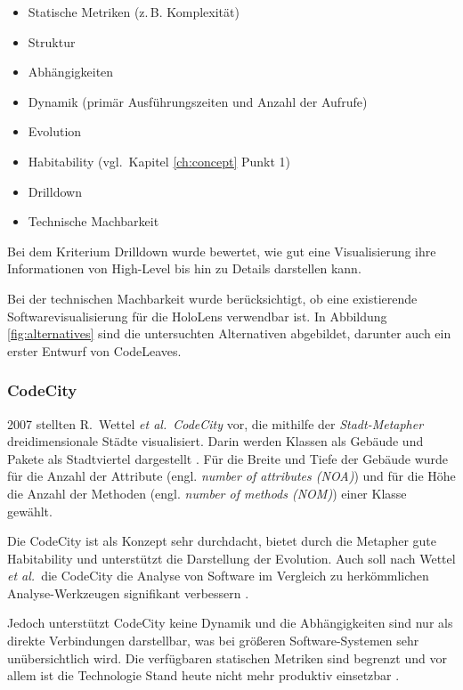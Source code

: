 \begin{itemize}
  \item Statische Metriken (z.\,B. Komplexität)
  \item Struktur
  \item Abhängigkeiten
  \item Dynamik (primär Ausführungszeiten und Anzahl der Aufrufe)
  \item Evolution
  \item Habitability (vgl.\ Kapitel \ref{ch:concept} Punkt 1)
  \item Drilldown
  \item Technische Machbarkeit
\end{itemize}

Bei dem Kriterium Drilldown wurde bewertet, wie gut eine Visualisierung ihre Informationen von High-Level bis hin zu Details darstellen kann.

Bei der technischen Machbarkeit wurde berücksichtigt, ob eine existierende Softwarevisualisierung für die HoloLens verwendbar ist. In Abbildung \ref{fig:alternatives} sind die untersuchten Alternativen abgebildet, darunter auch ein erster Entwurf von CodeLeaves.

\subsubsection*{CodeCity}
2007 stellten R.\ Wettel \textit{et al.}\ \textit{CodeCity} vor, die mithilfe der \textit{Stadt-Metapher} dreidimensionale Städte visualisiert. Darin werden Klassen als Gebäude und Pakete als Stadtviertel dargestellt \cite{wettel2007program, wettel2008visual, wettel2011software}. Für die Breite und Tiefe der Gebäude wurde für die Anzahl der Attribute (engl. \emph{number of attributes (NOA)}) und für die Höhe die Anzahl der Methoden (engl. \emph{number of methods (NOM)}) einer Klasse gewählt.

Die CodeCity ist als Konzept sehr durchdacht, bietet durch die Metapher gute Habitability und unterstützt die Darstellung der Evolution. Auch soll nach Wettel \textit{et al.}\ die CodeCity die Analyse von Software im Vergleich zu herkömmlichen Analyse-Werkzeugen signifikant verbessern \cite{wettel2011software}.

Jedoch unterstützt CodeCity keine Dynamik und die Abhängigkeiten sind nur als direkte Verbindungen darstellbar, was bei größeren Software-Systemen sehr unübersichtlich wird. Die verfügbaren statischen Metriken sind begrenzt und vor allem ist die Technologie Stand heute nicht mehr produktiv einsetzbar \cite{puetz2017softwarevisualisierung}.


